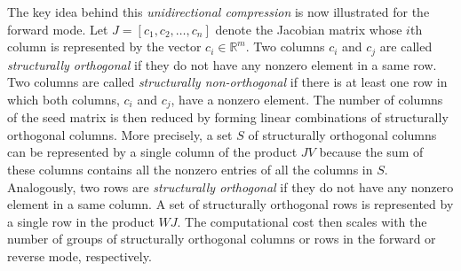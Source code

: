 \documentclass[12pt, oneside]{book}
\newcommand{\setR}{\ensuremath{\mathbb{R}}}
\begin{document}
The key idea behind this \emph{unidirectional compression} is now illustrated for the
forward mode. Let $J=[c_1, c_2, \dots, c_n]$ denote the Jacobian matrix whose $i$th
column is represented by the vector $c_i \in \setR^m$. Two columns $c_i$ and $c_j$ are
called \emph{structurally orthogonal} if they do not have any nonzero element in a same
row. Two columns are called \emph{structurally non-orthogonal} if there is at least one
row in which both columns, $c_i$ and $c_j$, have a nonzero element. The number of columns
of the seed matrix is then reduced by forming linear combinations of structurally
orthogonal columns. More precisely, a set $S$ of structurally orthogonal columns can be
represented by a single column of the product $JV$ because the sum of these columns
contains all the nonzero entries of all the columns in $S$. Analogously, two rows are
\emph{structurally orthogonal} if they do not have any nonzero element in a same column.
A set of structurally orthogonal rows is represented by a single row in the product $WJ$.
The computational cost then scales with the number of groups of structurally orthogonal
columns or rows in the forward or reverse mode, respectively.
\end{document}
